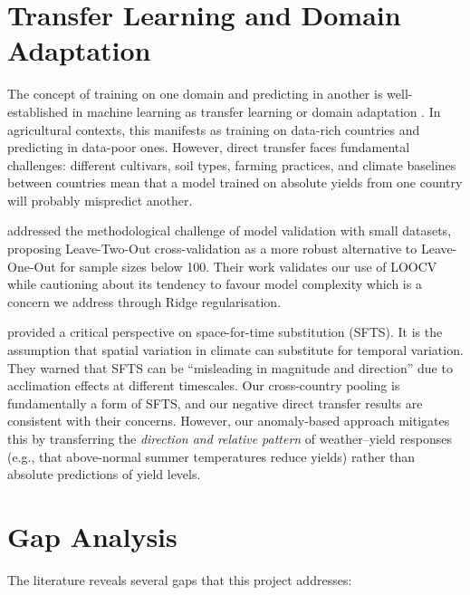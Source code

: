 \documentclass[12pt,a4paper]{report}
\begin{document}
\section{Transfer Learning and Domain Adaptation}

The concept of training on one domain and predicting in another is well-established in machine learning as transfer learning or domain adaptation \citep{pan2010}. In agricultural contexts, this manifests as training on data-rich countries and predicting in data-poor ones. However, direct transfer faces fundamental challenges: different cultivars, soil types, farming practices, and climate baselines between countries mean that a model trained on absolute yields from one country will probably mispredict another.

\citet{dinh2022} addressed the methodological challenge of model validation with small datasets, proposing Leave-Two-Out cross-validation as a more robust alternative to Leave-One-Out for sample sizes below 100. Their work validates our use of LOOCV while cautioning about its tendency to favour model complexity which is a concern we address through Ridge regularisation.

\citet{evans2025} provided a critical perspective on space-for-time substitution (SFTS). It is the assumption that spatial variation in climate can substitute for temporal variation. They warned that SFTS can be ``misleading in magnitude and direction'' due to acclimation effects at different timescales. Our cross-country pooling is fundamentally a form of SFTS, and our negative direct transfer results are consistent with their concerns. However, our anomaly-based approach mitigates this by transferring the \emph{direction and relative pattern} of weather–yield responses (e.g., that above-normal 
  summer temperatures reduce yields) rather than absolute predictions of yield levels.

\section{Gap Analysis}

The literature reveals several gaps that this project addresses:
\end{document}
